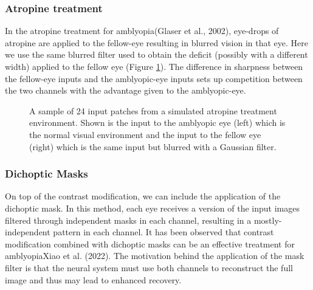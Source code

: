 \documentclass[
  onecolumn]{article}
\begin{document}
\hypertarget{atropine-treatment}{%
\subsubsection{Atropine treatment}\label{atropine-treatment}}

In the atropine treatment for amblyopia(Glaser et al., 2002), eye-drops
of atropine are applied to the fellow-eye resulting in blurred vision in
that eye. Here we use the same blurred filter used to obtain the deficit
(possibly with a different width) applied to the fellow eye (Figure
\ref{fig:atropine-inputs}). The difference in sharpness between the
fellow-eye inputs and the amblyopic-eye inputs sets up competition
between the two channels with the advantage given to the amblyopic-eye.

\begin{figure}
\hypertarget{fig:atropine-inputs}{%
\centering

\caption{A sample of 24 input patches from a simulated atropine
treatment environment. Shown is the input to the amblyopic eye (left)
which is the normal visual environment and the input to the fellow eye
(right) which is the same input but blurred with a Gaussian
filter.}\label{fig:atropine-inputs}
}
\end{figure}

\hypertarget{dichoptic-masks}{%
\subsubsection{Dichoptic Masks}\label{dichoptic-masks}}

On top of the contrast modification, we can include the application of
the dichoptic mask. In this method, each eye receives a version of the
input images filtered through independent masks in each channel,
resulting in a mostly-independent pattern in each channel. It has been
observed that contrast modification combined with dichoptic masks can be
an effective treatment for amblyopiaXiao et al. (2022). The motivation
behind the application of the mask filter is that the neural system must
use both channels to reconstruct the full image and thus may lead to
enhanced recovery.
\end{document}
